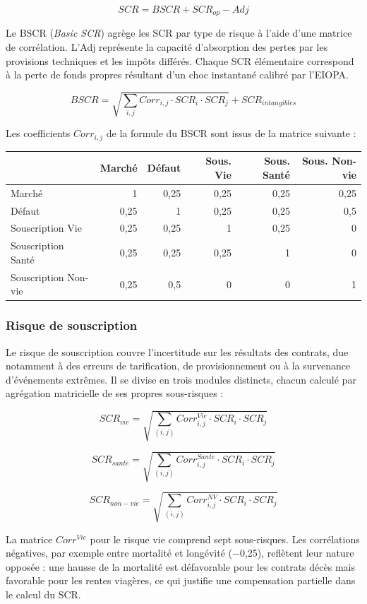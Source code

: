 \documentclass[
]{article}
\begin{document}
\[SCR = BSCR + SCR_{op} - Adj\]

Le BSCR (\emph{Basic SCR}) agrège les SCR par type de risque à l'aide
d'une matrice de corrélation. L'Adj représente la capacité d'absorption
des pertes par les provisions techniques et les impôts différés. Chaque
SCR élémentaire correspond à la perte de fonds propres résultant d'un
choc instantané calibré par l'EIOPA.

\[BSCR = \sqrt{\sum_{i,j} Corr_{i,j} \cdot SCR_i \cdot SCR_j} + SCR_{intangibles}\]

Les coefficients \(Corr_{i,j}\) de la formule du BSCR sont issus de la
matrice suivante :

\begin{longtable}[]{@{}lrrrrr@{}}
\toprule\noalign{}
& Marché & Défaut & Sous. Vie & Sous. Santé & Sous. Non-vie \\
\midrule\noalign{}
\endhead
\bottomrule\noalign{}
\endlastfoot
Marché & 1 & 0,25 & 0,25 & 0,25 & 0,25 \\
Défaut & 0,25 & 1 & 0,25 & 0,25 & 0,5 \\
Souscription Vie & 0,25 & 0,25 & 1 & 0,25 & 0 \\
Souscription Santé & 0,25 & 0,25 & 0,25 & 1 & 0 \\
Souscription Non-vie & 0,25 & 0,5 & 0 & 0 & 1 \\
\end{longtable}

\subsubsection{Risque de souscription}\label{risque-de-souscription}

Le risque de souscription couvre l'incertitude sur les résultats des
contrats, due notamment à des erreurs de tarification, de
provisionnement ou à la survenance d'événements extrêmes. Il se divise
en trois modules distincts, chacun calculé par agrégation matricielle de
ses propres sous-risques :

\[SCR_{vie} = \sqrt{\sum_{(i,j)} Corr^{Vie}_{i,j} \cdot SCR_i \cdot SCR_j}\]

\[SCR_{sant\acute{e}} = \sqrt{\sum_{(i,j)} Corr^{Sant\acute{e}}_{i,j} \cdot SCR_i \cdot SCR_j}\]

\[SCR_{non-vie} = \sqrt{\sum_{(i,j)} Corr^{NV}_{i,j} \cdot SCR_i \cdot SCR_j}\]

La matrice \(Corr^{Vie}\) pour le risque vie comprend sept sous-risques.
Les corrélations négatives, par exemple entre mortalité et longévité
(−0,25), reflètent leur nature opposée : une hausse de la mortalité est
défavorable pour les contrats décès mais favorable pour les rentes
viagères, ce qui justifie une compensation partielle dans le calcul du
SCR.
\end{document}
